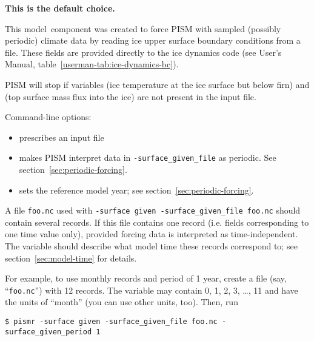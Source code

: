 \documentclass[titlepage,letterpaper,final]{scrartcl}
\begin{document}
\begin{center}
  \bf This is the default choice.
\end{center}

This model~component was created to force PISM with sampled (possibly periodic)
climate data by reading ice upper surface boundary conditions from a file.
These fields are provided directly to the ice dynamics code (see User's
Manual, table~\ref*{userman-tab:ice-dynamics-bc}).

PISM will stop if variables  (ice temperature at the
ice surface but below firn) and  (top surface
mass flux into the ice) are not present in the input file.

Command-line options:
\begin{itemize}
\item {} prescribes an input file
\item {} makes PISM interpret data in
\texttt{-surface_given_file} as periodic. See section~\ref{sec:periodic-forcing}.
\item {} sets the reference model year;
  see section~\ref{sec:periodic-forcing}.
\end{itemize}

A file \texttt{foo.nc} used with \texttt{-surface given -surface_given_file
  foo.nc} should contain several records. If this file contains one record
(i.e. fields corresponding to one time value only), provided forcing data is
interpreted as time-independent. The  variable should describe
what model time these records correspond to; see section~\ref{sec:model-time}
for details.

For example, to use monthly records and period of 1 year, create a file (say,
``\texttt{foo.nc}'') with 12 records. The  variable may contain
0, 1, 2, 3, \dots, 11 and have the units of ``month'' (you can use other units,
too). Then, run
\begin{verbatim}
$ pismr -surface given -surface_given_file foo.nc -surface_given_period 1
\end{verbatim}
\end{document}
